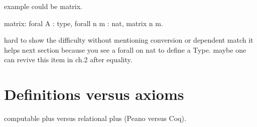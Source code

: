 example could be matrix.

\begin{coq}{}
matrix: foral A : type, forall n m : nat, matrix n m.
\end{coq}

hard to show the difficulty without mentioning conversion or dependent match
it helps next section because you see a forall on nat to define a Type.
maybe one can revive this item in ch.2 after equality.


\section{Definitions versus axioms}

computable plus versus relational plus (Peano versus Coq).
